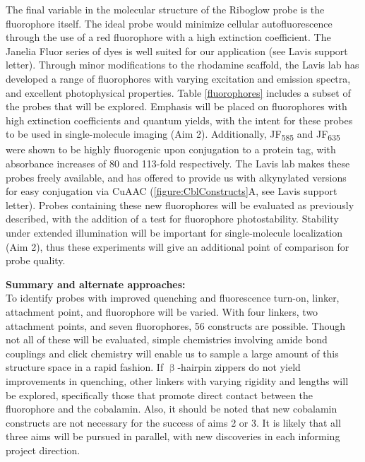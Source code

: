 The final variable in the molecular structure of the Riboglow probe is the fluorophore itself. The ideal probe would minimize cellular autofluorescence through the use of a red fluorophore with a high extinction coefficient. The Janelia Fluor series of dyes is well suited for our application (see Lavis support letter)\cite{Grimmgeneralmethodfinetune2017,Grimmgeneralmethodimprove2015}. Through minor modifications to the rhodamine scaffold, the Lavis lab has developed a range of fluorophores with varying excitation and emission spectra, and excellent photophysical properties.
Table \ref{fluorophores} includes a subset of the probes that will be explored.
Emphasis will be placed on fluorophores with high extinction coefficients and quantum yields, with the intent for these probes to be used in single-molecule imaging (Aim 2).
Additionally, JF\textsubscript{585} and JF\textsubscript{635} were shown to be highly fluorogenic upon conjugation to a protein tag, with absorbance increases of 80 and 113-fold respectively\cite{Grimmgeneralmethodfinetune2017}.
The Lavis lab makes these probes freely available, and has offered to provide us with alkynylated versions for easy conjugation via CuAAC (\ref{figure:CblConstructs}A, see Lavis support letter).
Probes containing these new fluorophores will be evaluated as previously described, with the addition of a test for fluorophore photostability.
Stability under extended illumination will be important for single-molecule localization (Aim 2), thus these experiments will give an additional point of comparison for probe quality.

\textbf{Summary and alternate approaches:}\\
To identify probes with improved quenching and fluorescence turn-on, linker, attachment point, and fluorophore will be varied. With four linkers, two attachment points, and seven fluorophores, 56 constructs are possible. Though not all of these will be evaluated, simple chemistries involving amide bond couplings and click chemistry will enable us to sample a large amount of this structure space in a rapid fashion. If $\upbeta$-hairpin zippers do not yield improvements in quenching, other linkers with varying rigidity and lengths will be explored\cite{LeeDesignSynthesisCharacterization2009}, specifically those that promote direct contact between the fluorophore and the cobalamin. Also, it should be noted that new cobalamin constructs are not necessary for the success of aims 2 or 3. It is likely that all three aims will be pursued in parallel, with new discoveries in each informing project direction.

